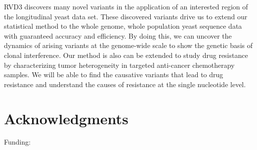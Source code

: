 \documentclass[11pt,reqno]{amsart}
\begin{document}
RVD3 discovers many novel variants in the application of an interested region of the longitudinal yeast data set.
These discovered variants drive us to extend our statistical method to the whole genome, whole population yeast sequence data with guaranteed accuracy and efficiency.
By doing this, we can uncover the dynamics of arising variants at the genome-wide scale to show the genetic basis of clonal interference.
Our method is also can be extended to study drug resistance by characterizing tumor heterogeneity in targeted anti-cancer chemotherapy samples.
We will be able to find the causative variants that lead to drug resistance and understand the causes of resistance at the single nucleotide level.

\section*{Acknowledgments}
Funding:


\appendix



\end{document}
